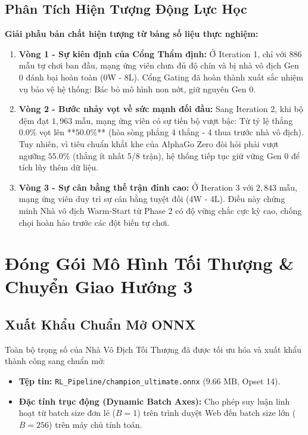 \documentclass[12pt,a4paper,oneside]{report}
\begin{document}
\section{Phân Tích Hiện Tượng Động Lực Học}

\begin{pedagogy}
\textbf{Giải phẫu bản chất hiện tượng từ bảng số liệu thực nghiệm:}
\begin{enumerate}
    \item \textbf{Vòng 1 - Sự kiên định của Cổng Thẩm định:} Ở Iteration 1, chỉ với 886 mẫu tự chơi ban đầu, mạng ứng viên chưa đủ độ chín và bị nhà vô địch Gen 0 đánh bại hoàn toàn (0W - 8L). Cổng Gating đã hoàn thành xuất sắc nhiệm vụ bảo vệ hệ thống: Bác bỏ mô hình non nớt, giữ nguyên Gen 0.
    \item \textbf{Vòng 2 - Bước nhảy vọt về sức mạnh đối đầu:} Sang Iteration 2, khi bộ đệm đạt $1,963$ mẫu, mạng ứng viên có sự tiến bộ vượt bậc: Từ tỷ lệ thắng $0.0\%$ vọt lên **$50.0\%$** (hòa sòng phẳng 4 thắng - 4 thua trước nhà vô địch). Tuy nhiên, vì tiêu chuẩn khắt khe của AlphaGo Zero đòi hỏi phải vượt ngưỡng $55.0\%$ (thắng ít nhất 5/8 trận), hệ thống tiếp tục giữ vững Gen 0 để tích lũy thêm dữ liệu.
    \item \textbf{Vòng 3 - Sự cân bằng thế trận đỉnh cao:} Ở Iteration 3 với $2,843$ mẫu, mạng ứng viên duy trì sự cân bằng tuyệt đối (4W - 4L). Điều này chứng minh Nhà vô địch Warm-Start từ Phase 2 có độ vững chắc cực kỳ cao, chống chọi hoàn hảo trước các đột biến tự chơi.
\end{enumerate}
\end{pedagogy}


\chapter{Đóng Gói Mô Hình Tối Thượng \& Chuyển Giao Hướng 3}

\section{Xuất Khẩu Chuẩn Mở ONNX}

Toàn bộ trọng số của Nhà Vô Địch Tối Thượng đã được tối ưu hóa và xuất khẩu thành công sang chuẩn mở:
\begin{itemize}
    \item \textbf{Tệp tin:} \texttt{RL\_Pipeline/champion\_ultimate.onnx} ($9.66\text{ MB}$, Opset 14).
    \item \textbf{Đặc tính trục động (Dynamic Batch Axes):} Cho phép suy luận linh hoạt từ batch size đơn lẻ ($B=1$) trên trình duyệt Web đến batch size lớn ($B=256$) trên máy chủ tính toán.
\end{itemize}
\end{document}
